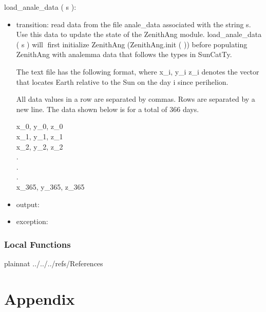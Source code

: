\documentclass[12pt, titlepage]{article}
\begin{document}
\noindent  load\_anale\_data ( s ):
\begin{itemize}
\item transition: read data from the file anale\_data associated with the string s. Use
this data to update the state of the ZenithAng module. load\_anale\_data ( s ) will first initialize ZenithAng (ZenithAng.init ( )) before populating ZenithAng with analemma data that follows the types in SunCatTy.

The text file has the following format, where x\_i, y\_i z\_i denotes the vector that locates
Earth relative to the Sun on the day i since perihelion.

All data values in a row are separated by commas. Rows are separated by a new line. The data shown below is for a total of 366 days.
\begin{center}
x\_0,   y\_0,   z\_0\\
x\_1,   y\_1,   z\_1\\
x\_2,   y\_2,   z\_2\\
.\\
.\\
.\\
x\_365,   y\_365,   z\_365\\
\end{center}
\item output: 
\item exception: 
\end{itemize}
 

\subsubsection{Local Functions}


\newpage

 {plainnat}
 {../../../refs/References}

\newpage

\section{Appendix} \label{Appendix}

\end{document}

